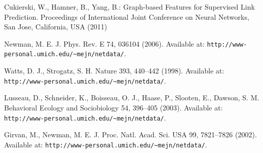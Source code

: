\documentclass{llncs}
\begin{document}
%

%
%
\begin{thebibliography}{}
%
%
%
%
%

Cukierski, W., Hamner, B., Yang, B.:
Graph-based Features for Supervised Link Prediction.
Proceedings of International Joint Conference on Neural Networks, San Jose, California, USA (2011)

Newman, M. E. J.
Phys. Rev. E 74, 036104 (2006). 
Available at: \texttt{http://www-personal.umich.edu/\~{}mejn/netdata/}.

Watts, D. J., Strogatz, S. H.
Nature 393, 440--442 (1998). 
Available at: \texttt{http://www-personal.umich.edu/\~{}mejn/netdata/}.

Lusseau, D., Schneider, K., Boisseau, O. J., Haase, P., Slooten, E., Dawson, S. M.
Behavioral Ecology and Sociobiology 54, 396--405 (2003). 
Available at: \texttt{http://www-personal.umich.edu/\~{}mejn/netdata/}.

Girvan, M., Newman, M. E. J.
Proc. Natl. Acad. Sci. USA 99, 7821--7826 (2002). 
Available at: \texttt{http://www-personal.umich.edu/\~{}mejn/netdata/}.


\end{thebibliography}
\end{document}
